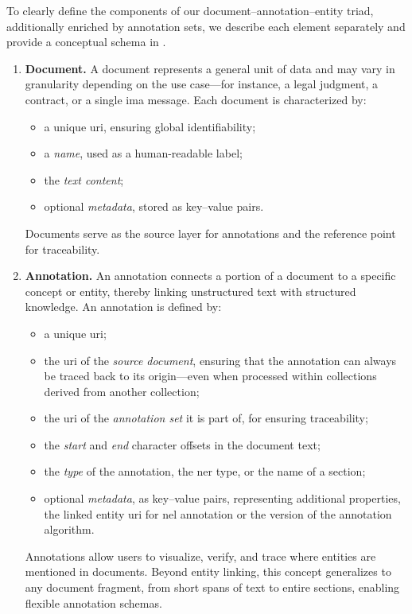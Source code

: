 To clearly define the components of our document--annotation--entity triad, additionally enriched by annotation sets, we describe each element separately and provide a conceptual schema in .



\begin{enumerate}[label=\textbf{\arabic*.}, leftmargin=2em]
  \item \textbf{Document.}  
  A document represents a general unit of data and may vary in granularity depending on the use case---for instance, a legal judgment, a contract, or a single \acs{ima} message.  
  Each document is characterized by:
  \begin{itemize}
    \item a unique \ac{uri}, ensuring global identifiability;
    \item a \emph{name}, used as a human-readable label;
    \item the \emph{text content};
    \item optional \emph{metadata}, stored as key--value pairs.  
  \end{itemize}
  Documents serve as the source layer for annotations and the reference point for traceability.

  \item \textbf{Annotation.}  
  An annotation connects a portion of a document to a specific concept or entity, thereby linking unstructured text with structured knowledge. An annotation is defined by:
  \begin{itemize}
    \item a unique \ac{uri};
    \item the \ac{uri} of the \emph{source document}, ensuring that the annotation can always be traced back to its origin---even when processed within collections derived from another collection;
    \item the \ac{uri} of the \emph{annotation set} it is part of, for ensuring traceability;
    \item the \emph{start} and \emph{end} character offsets in the document text;
    \item the \emph{type} of the annotation, \eg the \ac{ner} type, or the name of a section;
    \item optional \emph{metadata}, as key--value pairs, representing additional properties, \eg the linked entity \ac{uri} for \ac{nel} annotation or the version of the annotation algorithm.  
  \end{itemize}
  Annotations allow users to visualize, verify, and trace where entities are mentioned in documents. Beyond entity linking, this concept generalizes to any document fragment, from short spans of text to entire sections, enabling flexible annotation schemas.


\end{enumerate}

